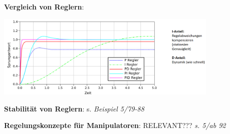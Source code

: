 \textbf{Vergleich von Reglern}:
\begin{center}
	\includegraphics[width=0.8\textwidth]{images/r-vergleich.png}
\end{center}

\textbf{Stabilität von Reglern}: s. \textit{Beispiel 5/79-88}

\textbf{Regelungskonzepte für Manipulatoren}: RELEVANT??? \textit{s. 5/ab 92}